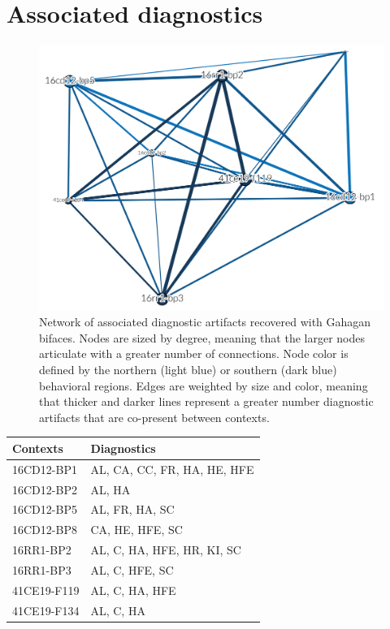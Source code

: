 \documentclass[]{interact}
\theoremstyle{plain}%
\theoremstyle{definition}
\theoremstyle{remark}
\begin{document}
\hypertarget{associated-diagnostics}{%
\section{Associated diagnostics}\label{associated-diagnostics}}

\begin{figure}

{\centering \includegraphics[width=0.7\linewidth]{img/fig03} 

}

\caption{Network of associated diagnostic artifacts recovered with Gahagan bifaces. Nodes are sized by degree, meaning that the larger nodes articulate with a greater number of connections. Node color is defined by the northern (light blue) or southern (dark blue) behavioral regions. Edges are weighted by size and color, meaning that thicker and darker lines represent a greater number diagnostic artifacts that are co-present between contexts.}\label{fig:associated.net}
\end{figure}

\begin{table}
{\begin{tabular}{ll} \toprule
Contexts & Diagnostics \\
\midrule
16CD12-BP1 & AL, CA, CC, FR, HA, HE, HFE \\
16CD12-BP2 & AL, HA \\
16CD12-BP5 & AL, FR, HA, SC \\
16CD12-BP8 & CA, HE, HFE, SC \\
16RR1-BP2 & AL, C, HA, HFE, HR, KI, SC \\
16RR1-BP3 & AL, C, HFE, SC \\
41CE19-F119 & AL, C, HA, HFE \\
41CE19-F134 & AL, C, HA \\
\bottomrule
\end{tabular}}
\label{sample-table}
\end{table}
\end{document}
